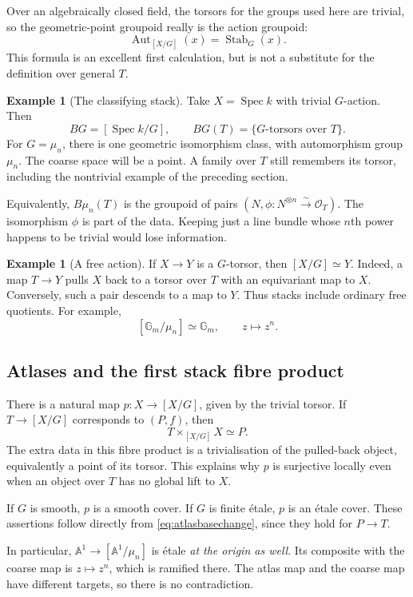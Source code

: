 \documentclass[11pt,a4paper]{article}
\numberwithin{equation}{section}
\theoremstyle{definition}
\newtheorem{example}[proposition]{Example}
\newcommand{\A}{\mathbb A}
\newcommand{\Gm}{\mathbb G_m}
\newcommand{\OO}{\mathcal O}
\newcommand{\Spec}{\operatorname{Spec}}
\newcommand{\Aut}{\operatorname{Aut}}
\newcommand{\Stab}{\operatorname{Stab}}
\begin{document}
Over an algebraically closed field, the torsors for the groups used here are
trivial, so the geometric-point groupoid really is the action groupoid:
\[
 \Aut_{[X/G]}(x)=\Stab_G(x).
\]
This formula is an excellent first calculation, but is not a substitute for
the definition over general $T$.

\begin{example}[The classifying stack]
Take $X=\Spec k$ with trivial $G$-action. Then
\[
 BG=[\Spec k/G],\qquad BG(T)=\{G\text{-torsors over }T\}.
\]
For $G=\mu_n$, there is one geometric isomorphism class, with automorphism
group $\mu_n$. The coarse space will be a point. A family over $T$ still
remembers its torsor, including the nontrivial example of the preceding section.

Equivalently, $B\mu_n(T)$ is the groupoid of pairs
$(N,\phi:N^{\otimes n}\xrightarrow{\sim}\OO_T)$.
The isomorphism $\phi$ is part of the data. Keeping just a line bundle whose
$n$th power happens to be trivial would lose information.
\end{example}

\begin{example}[A free action]
If $X\to Y$ is a $G$-torsor, then $[X/G]\simeq Y$. Indeed, a map $T\to Y$
pulls $X$ back to a torsor over $T$ with an equivariant map to $X$. Conversely,
such a pair descends to a map to $Y$. Thus stacks include ordinary free
quotients. For example,
\[
 [\Gm/\mu_n]\simeq\Gm,\qquad z\longmapsto z^n.
\]
\end{example}

\subsection{Atlases and the first stack fibre product}
There is a natural map $p:X\to[X/G]$, given by the trivial torsor. If
$T\to[X/G]$ corresponds to $(P,f)$, then
\begin{equation}\label{eq:atlasbasechange}
 T\times_{[X/G]}X\simeq P.
\end{equation}
The extra data in this fibre product is a trivialisation of the pulled-back
object, equivalently a point of its torsor. This explains why $p$ is
surjective locally even when an object over $T$ has no global lift to $X$.

If $G$ is smooth, $p$ is a smooth cover. If $G$ is finite étale, $p$ is an
étale cover. These assertions follow directly from
\eqref{eq:atlasbasechange}, since they hold for $P\to T$.

In particular, $\A^1\to[\A^1/\mu_n]$ is étale \emph{at the origin as well}.
Its composite with the coarse map is $z\mapsto z^n$, which is ramified there.
The atlas map and the coarse map have different targets, so there is no
contradiction.
\end{document}
